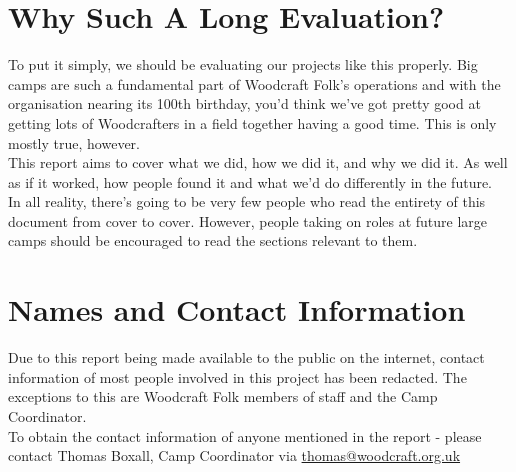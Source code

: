 \section{Why Such A Long Evaluation?}
To put it simply, we should be evaluating our projects like this properly. Big camps are such a fundamental part of Woodcraft Folk's operations and with the organisation nearing its 100th birthday, you'd think we've got pretty good at getting lots of Woodcrafters in a field together having a good time. This is only mostly true, however.\\

This report aims to cover what we did, how we did it, and why we did it. As well as if it worked, how people found it and what we'd do differently in the future. \\

In all reality, there's going to be very few people who read the entirety of this document from cover to cover. However, people taking on roles at future large camps should be encouraged to read the sections relevant to them. 

\section{Names and Contact Information}
Due to this report being made available to the public on the internet, contact information of most people involved in this project has been redacted. The exceptions to this are Woodcraft Folk members of staff and the Camp Coordinator.\\

To obtain the contact information of anyone mentioned in the report - please contact Thomas Boxall, Camp Coordinator via \href{mailto:thomas@woodcraft.org.uk}{thomas@woodcraft.org.uk}
